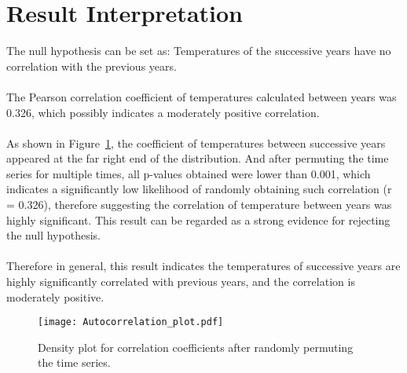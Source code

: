 \documentclass{article}
\begin{document}
\section*{Result Interpretation}
The null hypothesis can be set as: Temperatures of the successive years have no correlation with the previous years. 
\\
\\The Pearson correlation coefficient of temperatures calculated between years was 0.326, which possibly indicates a moderately positive correlation.
\\
\\As shown in Figure~\ref{fig:Autocorrelation}, the coefficient of temperatures between successive years appeared at the far right end of the distribution. And after permuting the time series for multiple times, all p-values obtained were lower than 0.001, which indicates a significantly low likelihood of randomly obtaining such correlation (r = 0.326), therefore suggesting the correlation of temperature between years was highly significant. This result can be regarded as a strong evidence for rejecting the null hypothesis.
\\
\\Therefore in general, this result indicates the temperatures of successive years are highly significantly correlated with previous years, and the correlation is moderately positive. 
\begin{figure}[h!]
    \centering
    \texttt{[image: Autocorrelation\_plot.pdf]}
    \caption{Density plot for correlation coefficients after randomly permuting the time series.}
    \label{fig:Autocorrelation}
\end{figure}




\end{document}
